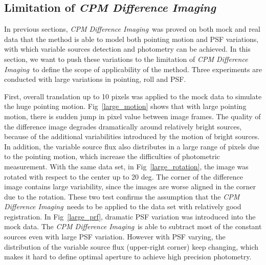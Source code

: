 \documentclass[12pt, preprint]{aastex}
\newcommand{\project}[1]{\textsl{#1}}
\newcommand{\cpmdiff}{\project{CPM Difference Imaging}}
\begin{document}
\subsection{Limitation of \cpmdiff}
In previous sections,  \cpmdiff\ was proved on both mock and real data that the method is able to model both pointing motion and PSF variations, with which variable sources detection and photometry can be achieved.
In this section, we want to push these variations to the limitation of \cpmdiff\ to define the scope of applicability of the method. Three experiments are conducted with large variations in pointing, roll and PSF.

First, overall translation up to 10 pixels was applied to the mock data to simulate the huge pointing motion.   
Fig~\ref{large_motion} shows that with large pointing motion, there is sudden jump in pixel value between image frames. 
The quality of the difference image degrades dramatically around relatively bright sources, because of the additional variabilities introduced by the motion of bright sources.
In addition,  the variable source flux also distributes in a large range of pixels due to the pointing motion, which increase the difficulties of photometric measurement.
With the same data set, in Fig~\ref{large_rotation}, the image was rotated with respect to the center up to 20 deg. 
The corner of the difference image contains large variability, since the images are worse aligned in the corner due to the rotation. 
These two test confirms the assumption that the \cpmdiff\ needs to be applied to the data set with relatively good registration.
In Fig~\ref{large_prf}, dramatic PSF variation was introduced into the mock data.
The \cpmdiff\ is able to subtract most of the constant sources even with large PSF variation. 
However with PSF varying, the distribution of the variable source flux (upper-right corner) keep changing, which makes it hard to define optimal aperture to achieve high precision photometry. 
\end{document}
